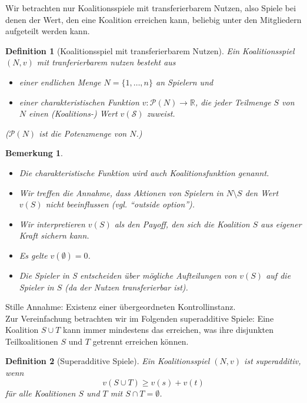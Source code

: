 \documentclass[12pt]{extreport} %
\theoremstyle{named}
\theoremstyle{itshape}
\newtheorem*{definition}{Definition}
\theoremstyle{normal}
\newtheorem*{bemerkung}{Bemerkung}
\begin{document}
Wir betrachten nur Koalitionsspiele mit transferierbarem Nutzen, also Spiele bei denen der Wert, den eine Koalition erreichen kann, beliebig unter den Mitgliedern aufgeteilt werden kann.

\begin{definition}[Koalitionsspiel mit transferierbarem Nutzen]
	Ein Koalitionsspiel $(N, v)$ mit tranferierbarem nutzen besteht aus
	\begin{itemize}
		\item einer endlichen Menge $N = \{1, \dotsc, n\}$ an Spielern und
		\item einer charakteristischen Funktion $v \colon \mathcal{P}(N) \rightarrow \mathbb{R}$, die jeder Teilmenge $S$ von $N$ einen (Koalitions-) Wert $v(\mathcal{S})$ zuweist.
	\end{itemize}
	($\mathcal{P}(N)$ ist die Potenzmenge von $N$.)
\end{definition} 

\begin{bemerkung} ~\
  \begin{itemize}
	\item Die charakteristische Funktion wird auch Koalitionsfunktion genannt.
	\item Wir treffen die Annahme, dass Aktionen von Spielern in $N \setminus S$ den Wert $v(S)$ nicht beeinflussen (vgl. \enquote{outside option}).
	\item Wir interpretieren $v(S)$ als den Payoff, den sich die Koalition $S$ aus eigener Kraft sichern kann.
	\item Es gelte $v(\emptyset) = 0$.
	\item Die Spieler in S entscheiden über mögliche Aufteilungen von $v(S)$ auf die Spieler in $S$ (da der Nutzen transferierbar ist).	
  \end{itemize}	
\end{bemerkung}

Stille Annahme: Existenz einer übergeordneten Kontrollinstanz.~\\

Zur Vereinfachung betrachten wir im Folgenden superadditive Spiele: Eine Koalition $S \cup T$ kann immer mindestens das erreichen, was ihre disjunkten Teilkoalitionen $S$ und $T$ getrennt erreichen können.

\begin{definition}[Superadditive Spiele]
	Ein Koalitionsspiel $(N, v)$ ist superadditiv, wenn
	$$ v(S \cup T) \geq v(s) + v(t) $$
	für alle Koalitionen $S$ und $T$ mit $S \cap T = \emptyset$.
\end{definition}
	
\end{document}
